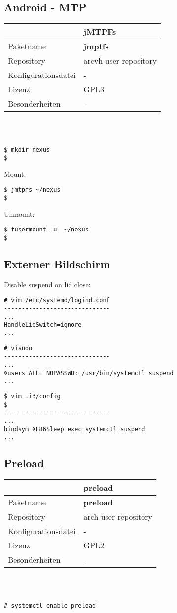 \subsection{Android - MTP}
\begin{tabular}{l|l}
~ & jMTPFs \\ \hline
Paketname & \textbf{jmptfs} \\ 
Repository & arcvh user repository\\
Konfigurationsdatei & - \\
Lizenz & GPL3 \\
Besonderheiten & - \\
\end{tabular}
\\ \\
\begin{lstlisting}[style=Bash]
$ mkdir nexus 
$
\end{lstlisting}
Mount: 
\begin{lstlisting}[style=Bash]
$ jmtpfs ~/nexus
$
\end{lstlisting}
Unmount: 
\begin{lstlisting}[style=Bash]
$ fusermount -u  ~/nexus
$
\end{lstlisting}

\subsection{Externer Bildschirm}
Disable suspend on lid close:
\begin{lstlisting}[style=Bash]
# vim /etc/systemd/logind.conf
------------------------------
...
HandleLidSwitch=ignore
...
\end{lstlisting}
\begin{lstlisting}[style=Bash]
# visudo
------------------------------
...
%users ALL= NOPASSWD: /usr/bin/systemctl suspend
...
\end{lstlisting}
\begin{lstlisting}[style=Bash]
$ vim .i3/config
$
------------------------------
...
bindsym XF86Sleep exec systemctl suspend
...
\end{lstlisting}

\subsection{Preload}
\begin{tabular}{l|l}
~ & preload \\ \hline
Paketname & \textbf{preload} \\ 
Repository & arch user repository\\
Konfigurationsdatei & - \\
Lizenz & GPL2 \\
Besonderheiten & - \\
\end{tabular}
\\ \\
\begin{lstlisting}[style=Bash]
# systemctl enable preload
\end{lstlisting}

